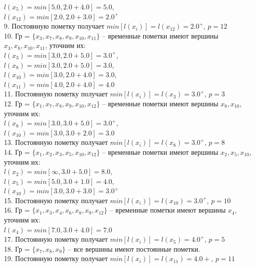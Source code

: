 \documentclass[a4paper,12pt]{article}
\begin{document}
\indent $l(x_{5}) = min[5.0, 2.0 + 4.0] = 5.0$, \\
\indent $l(x_{12}) = min[2.0, 2.0 + 3.0] = 2.0^+$ \\
9. Постоянную пометку получает $min[l(x_i)] = l(x_{12}) = 2.0^+$, $p = 12$ \\
10. Гр = $\{x_{3}, x_{7}, x_{8}, x_{9}, x_{10}, x_{11}\}$ – временные пометки имеют вершины $x_{3}, x_{8}, x_{10}, x_{11}$, уточним их: \\
\indent $l(x_{3}) = min[3.0, 2.0 + 5.0] = 3.0^+$, \\
\indent $l(x_{8}) = min[3.0, 2.0 + 5.0] = 3.0$, \\
\indent $l(x_{10}) = min[3.0, 2.0 + 4.0] = 3.0$, \\
\indent $l(x_{11}) = min[4.0, 2.0 + 4.0] = 4.0$ \\
11. Постоянную пометку получает $min[l(x_i)] = l(x_{3}) = 3.0^+$, $p = 3$ \\
12. Гр = $\{x_{1}, x_{7}, x_{8}, x_{9}, x_{10}, x_{12}\}$ – временные пометки имеют вершины $x_{8}, x_{10}$, уточним их: \\
\indent $l(x_{8}) = min[3.0, 3.0 + 5.0] = 3.0^+$, \\
\indent $l(x_{10}) = min[3.0, 3.0 + 2.0] = 3.0$ \\
13. Постоянную пометку получает $min[l(x_i)] = l(x_{8}) = 3.0^+$, $p = 8$ \\
14. Гр = $\{x_{1}, x_{2}, x_{3}, x_{5}, x_{10}, x_{12}\}$ – временные пометки имеют вершины $x_{2}, x_{5}, x_{10}$, уточним их: \\
\indent $l(x_{2}) = min[\infty, 3.0 + 5.0] = 8.0$, \\
\indent $l(x_{5}) = min[5.0, 3.0 + 1.0] = 4.0$, \\
\indent $l(x_{10}) = min[3.0, 3.0 + 3.0] = 3.0^+$ \\
15. Постоянную пометку получает $min[l(x_i)] = l(x_{10}) = 3.0^+$, $p = 10$ \\
16. Гр = $\{x_{1}, x_{3}, x_{4}, x_{6}, x_{8}, x_{9}, x_{12}\}$ – временные пометки имеют вершины $x_{4}$, уточним их: \\
\indent $l(x_{4}) = min[7.0, 3.0 + 4.0] = 7.0$ \\
17. Постоянную пометку получает $min[l(x_i)] = l(x_{5}) = 4.0^+$, $p = 5$ \\
18. Гр = $\{x_{7}, x_{8}, x_{9}\}$ – все вершины имеют постоянные пометки. \\
19. Постоянную пометку получает $min[l(x_i)] = l(x_{11}) = 4.0+$, $p = 11$ \\
\end{document}
